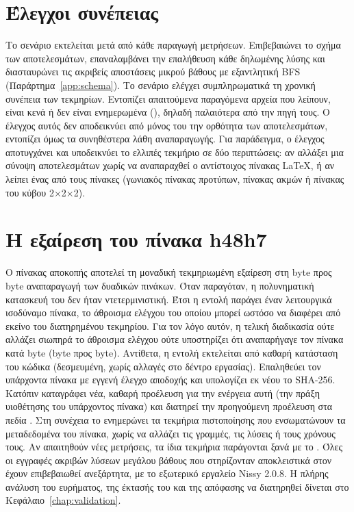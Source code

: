 \section{Έλεγχοι συνέπειας}
\label{sec:repro-checks}

Το σενάριο  εκτελείται μετά από κάθε παραγωγή μετρήσεων. Επιβεβαιώνει το σχήμα των αποτελεσμάτων, επαναλαμβάνει την επαλήθευση κάθε δηλωμένης λύσης και διασταυρώνει τις ακριβείς αποστάσεις μικρού βάθους με εξαντλητική BFS (Παράρτημα~\ref{app:schema}). Το σενάριο  ελέγχει συμπληρωματικά τη χρονική συνέπεια των τεκμηρίων. Εντοπίζει απαιτούμενα παραγόμενα αρχεία που λείπουν, είναι κενά ή δεν είναι ενημερωμένα (), δηλαδή παλαιότερα από την πηγή τους. Ο έλεγχος αυτός δεν αποδεικνύει από μόνος του την ορθότητα των αποτελεσμάτων, εντοπίζει όμως τα συνηθέστερα λάθη αναπαραγωγής. Για παράδειγμα, ο έλεγχος αποτυγχάνει και υποδεικνύει το ελλιπές τεκμήριο σε δύο περιπτώσεις: αν αλλάξει μια σύνοψη αποτελεσμάτων χωρίς να αναπαραχθεί ο αντίστοιχος πίνακας LaTeX, ή αν λείπει ένας από τους πίνακες (γωνιακός πίνακας προτύπων, πίνακας ακμών ή πίνακας του κύβου 2×2×2).

\section{Η εξαίρεση του πίνακα h48h7}
\label{sec:repro-h48h7}

Ο πίνακας αποκοπής  αποτελεί τη μοναδική τεκμηριωμένη εξαίρεση στη byte προς byte αναπαραγωγή των δυαδικών πινάκων. Όταν παραγόταν, η πολυνηματική κατασκευή του δεν ήταν ντετερμινιστική. Έτσι η εντολή  παράγει έναν λειτουργικά ισοδύναμο πίνακα, το άθροισμα ελέγχου του οποίου μπορεί ωστόσο να διαφέρει από εκείνο του διατηρημένου τεκμηρίου. Για τον λόγο αυτόν, η τελική διαδικασία ούτε αλλάζει σιωπηρά το άθροισμα ελέγχου ούτε υποστηρίζει ότι αναπαρήγαγε τον πίνακα κατά byte (byte προς byte). Αντίθετα, η εντολή  εκτελείται από καθαρή κατάσταση του κώδικα (δεσμευμένη, χωρίς αλλαγές στο δέντρο εργασίας). Επαληθεύει τον υπάρχοντα πίνακα με εγγενή έλεγχο αποδοχής και υπολογίζει εκ νέου το SHA-256. Κατόπιν καταγράφει νέα, καθαρή προέλευση για την ενέργεια αυτή (την πράξη υιοθέτησης του υπάρχοντος πίνακα) και διατηρεί την προηγούμενη προέλευση στα πεδία . Στη συνέχεια το  ενημερώνει τα τεκμήρια πιστοποίησης που ενσωματώνουν τα μεταδεδομένα του πίνακα, χωρίς να αλλάζει τις γραμμές, τις λύσεις ή τους χρόνους τους. Αν απαιτηθούν νέες μετρήσεις, τα ίδια τεκμήρια παράγονται ξανά με το . Όλες οι εγγραφές ακριβών λύσεων μεγάλου βάθους που στηρίζονταν αποκλειστικά στον  έχουν επιβεβαιωθεί ανεξάρτητα, με το εξωτερικό εργαλείο Nissy 2.0.8. Η πλήρης ανάλυση του ευρήματος, της έκτασής του και της απόφασης να διατηρηθεί δίνεται στο Κεφάλαιο~\ref{chap:validation}.

